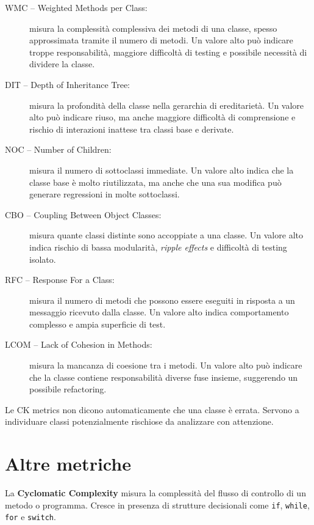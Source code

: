 \begin{description}
    \item[WMC -- Weighted Methods per Class:] misura la complessità complessiva dei metodi di una classe, spesso approssimata tramite il numero di metodi. Un valore alto può indicare troppe responsabilità, maggiore difficoltà di testing e possibile necessità di dividere la classe.

    \item[DIT -- Depth of Inheritance Tree:] misura la profondità della classe nella gerarchia di ereditarietà. Un valore alto può indicare riuso, ma anche maggiore difficoltà di comprensione e rischio di interazioni inattese tra classi base e derivate.

    \item[NOC -- Number of Children:] misura il numero di sottoclassi immediate. Un valore alto indica che la classe base è molto riutilizzata, ma anche che una sua modifica può generare regressioni in molte sottoclassi.

    \item[CBO -- Coupling Between Object Classes:] misura quante classi distinte sono accoppiate a una classe. Un valore alto indica rischio di bassa modularità, \emph{ripple effects} e difficoltà di testing isolato.

    \item[RFC -- Response For a Class:] misura il numero di metodi che possono essere eseguiti in risposta a un messaggio ricevuto dalla classe. Un valore alto indica comportamento complesso e ampia superficie di test.

    \item[LCOM -- Lack of Cohesion in Methods:] misura la mancanza di coesione tra i metodi. Un valore alto può indicare che la classe contiene responsabilità diverse fuse insieme, suggerendo un possibile refactoring.
\end{description}

\begin{notaesame}
Le CK metrics non dicono automaticamente che una classe è errata. Servono a individuare classi potenzialmente rischiose da analizzare con attenzione.
\end{notaesame}

\section{Altre metriche}

La \textbf{Cyclomatic Complexity} misura la complessità del flusso di controllo di un metodo o programma. Cresce in presenza di strutture decisionali come \texttt{if}, \texttt{while}, \texttt{for} e \texttt{switch}.

